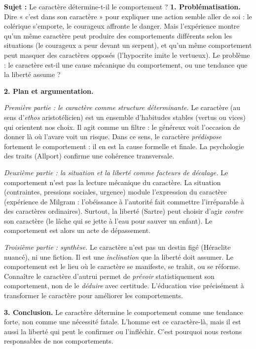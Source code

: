 \documentclass[11pt]{article}
\begin{document}
\begin{exoresolu}
\textbf{Sujet :} Le caractère détermine-t-il le comportement ?
\tcblower
\textbf{1. Problématisation.} Dire « c'est dans son caractère » pour expliquer une action semble aller de soi : le colérique s'emporte, le courageux affronte le danger. Mais l'expérience montre qu'un même caractère peut produire des comportements différents selon les situations (le courageux a peur devant un serpent), et qu'un même comportement peut masquer des caractères opposés (l'hypocrite imite le vertueux). Le problème : le caractère est-il une cause mécanique du comportement, ou une tendance que la liberté assume ?

\textbf{2. Plan et argumentation.}

\emph{Première partie : le caractère comme structure déterminante.} Le caractère (au sens d'\emph{ethos} aristotélicien) est un ensemble d'habitudes stables (vertus ou vices) qui orientent nos choix. Il agit comme un filtre : le généreux voit l'occasion de donner là où l'avare voit un risque. Dans ce sens, le caractère \emph{prédispose} fortement le comportement : il en est la cause formelle et finale. La psychologie des traits (Allport) confirme une cohérence transversale.

\emph{Deuxième partie : la situation et la liberté comme facteurs de décalage.} Le comportement n'est pas la lecture mécanique du caractère. La situation (contraintes, pressions sociales, urgence) module l'expression du caractère (expérience de Milgram : l'obéissance à l'autorité fait commettre l'irréparable à des caractères ordinaires). Surtout, la liberté (Sartre) peut choisir d'agir \emph{contre} son caractère (le lâche qui se jette à l'eau pour sauver un enfant). Le comportement est alors un acte de dépassement.

\emph{Troisième partie : synthèse.} Le caractère n'est pas un destin figé (Héraclite nuancé), ni une fiction. Il est une \emph{inclination} que la liberté doit assumer. Le comportement est le lieu où le caractère se manifeste, se trahit, ou se réforme. Connaître le caractère d'autrui permet de \emph{prévoir} statistiquement son comportement, non de le \emph{déduire} avec certitude. L'éducation vise précisément à transformer le caractère pour améliorer les comportements.

\textbf{3. Conclusion.} Le caractère détermine le comportement comme une tendance forte, non comme une nécessité fatale. L'homme est ce caractère-là, mais il est aussi la liberté qui peut le confirmer ou l'infléchir. C'est pourquoi nous restons responsables de nos comportements.
\end{exoresolu}
\end{document}
